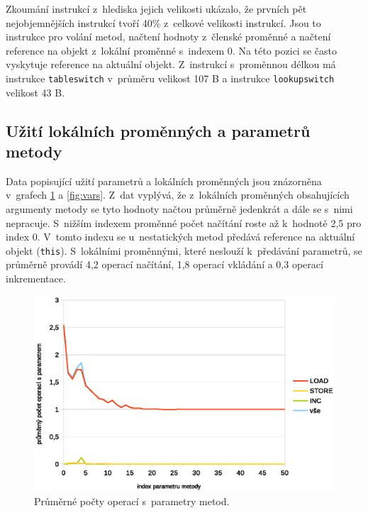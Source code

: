 Zkoumání instrukcí z~hlediska jejich velikosti ukázalo, že prvních pět nejobjemnějších instrukcí tvoří 40\% z~celkové velikosti instrukcí. Jsou to instrukce pro volání metod, načtení hodnoty z~členské proměnné a načtení reference na objekt z~lokální proměnné s~indexem 0. Na této pozici se často vyskytuje reference na aktuální objekt. Z~instrukcí s~proměnnou délkou má instrukce \texttt{tableswitch} v~průměru velikost 107 B a instrukce \texttt{lookupswitch} velikost 43 B.

\subsection{Užití lokálních proměnných a parametrů metody}

Data popisující užití parametrů a lokálních proměnných jsou znázorněna v~grafech \ref{fig:params} a \ref{fig:vars}. Z~dat vyplývá, že z~lokálních proměnných obsahujících argumenty metody se tyto hodnoty načtou průměrně jedenkrát a dále se s~nimi nepracuje. S~nižším indexem proměnné počet načítání roste až k~hodnotě 2,5 pro index 0. V~tomto indexu se u~nestatických metod předává reference na aktuální objekt (\texttt{this}). S~lokálními proměnnými, které neslouží k~předávání parametrů, se průměrně provádí 4,2 operací načítání, 1,8 operací vkládání a 0,3 operací inkrementace.

\begin{figure}[h!]
\centering
\includegraphics[scale=0.9]{fig/params}
\caption{Průměrné počty operací s~parametry metod.}\label{fig:params}
\end{figure}

